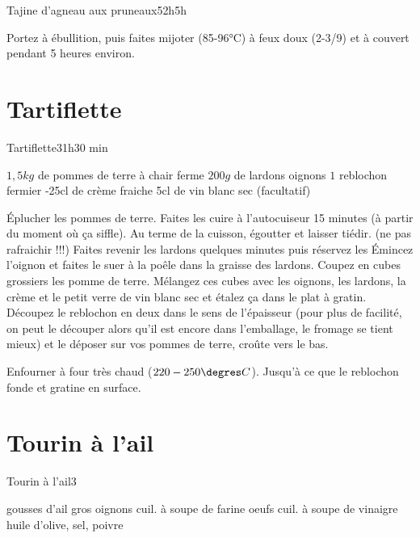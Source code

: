 {\begin{recette}{Tajine d'agneau aux pruneaux}{5}{2h}{5h}
\begin{cuisson}
Portez à ébullition, puis faites mijoter (85-96°C) à feux doux (2-3/9) et à couvert pendant 5 heures environ.
\end{cuisson}
\end{recette}

\section{Tartiflette}
\begin{recette}{Tartiflette}{3}{1h}{30 min}

\begin{ingredients}
\ingredient $1,5\unit{kg}$ de pommes de terre à chair ferme
\ingredient $200\unit{g}$ de lardons
 oignons
\ingredient $1$ reblochon fermier
-25cl de crème fraiche
\ingredient 5cl de vin blanc sec (facultatif)
\end{ingredients}

\begin{preparation}
\etape Éplucher les pommes de terre. Faites les cuire à l'autocuiseur 15 minutes (à partir du moment où ça siffle).
\etape Au terme de la cuisson, égoutter et laisser tiédir. (ne pas rafraichir !!!)
\etape Faites revenir les lardons quelques minutes puis réservez les
\etape Émincez l'oignon et faites le suer à la poêle dans la graisse des lardons.
\etape Coupez en cubes grossiers les pomme de terre. Mélangez ces cubes avec les oignons, les lardons, la crème et le petit 
verre de vin blanc sec et étalez ça dans le plat à gratin. 
\etape Découpez le reblochon en deux dans le sens de l'épaisseur (pour plus de facilité, on peut le découper alors qu'il est 
encore dans l'emballage, le fromage se tient mieux) et le déposer sur vos pommes de terre, croûte vers le bas.
\end{preparation}

\begin{cuisson}
Enfourner à four très chaud ($220-250\degres C$). Jusqu'à ce que le reblochon fonde et gratine en surface.
\end{cuisson}
\end{recette}

\section{Tourin à l'ail}
\begin{recette}{Tourin à l'ail}{3}{}{}
\begin{ingredients}
 gousses d'ail
 gros oignons
 cuil. à soupe de farine
 oeufs
 cuil. à soupe de vinaigre
\ingredient huile d'olive, sel, poivre
\end{ingredients}


\end{recette}}
